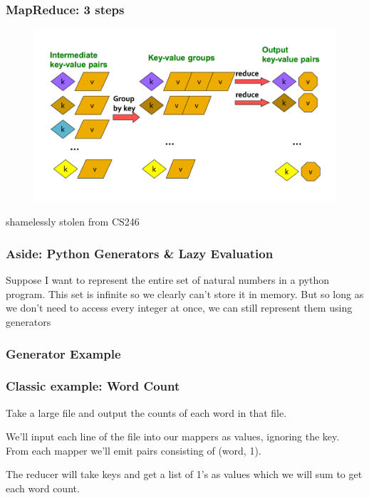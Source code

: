 \documentclass{beamer}
\begin{document}
\begin{frame}
\frametitle{MapReduce: 3 steps}
\begin{figure}[h]
\centering
\includegraphics[width=.95\textwidth]{images/mapreduce.png}
\end{figure}
shamelessly stolen from CS246
\end{frame}




\begin{frame}
\frametitle{Aside: Python Generators \& Lazy Evaluation}
Suppose I want to represent the entire set of natural numbers in a python program. This set is infinite so we clearly can't store it in memory. But so long as we don't need to access every integer at once, we can still represent them using generators 
\end{frame}

\begin{frame}
\frametitle{Generator Example}
\end{frame}

\begin{frame}
\frametitle{Classic example: Word Count}
Take a large file and output the counts of each word in that file. 

We'll input each line of the file into our mappers as values, ignoring the key. From each mapper we'll emit pairs consisting of (word, 1). 

The reducer will take keys and get a list of 1's as values which we will sum to get each word count.
\end{frame}
\end{document}
